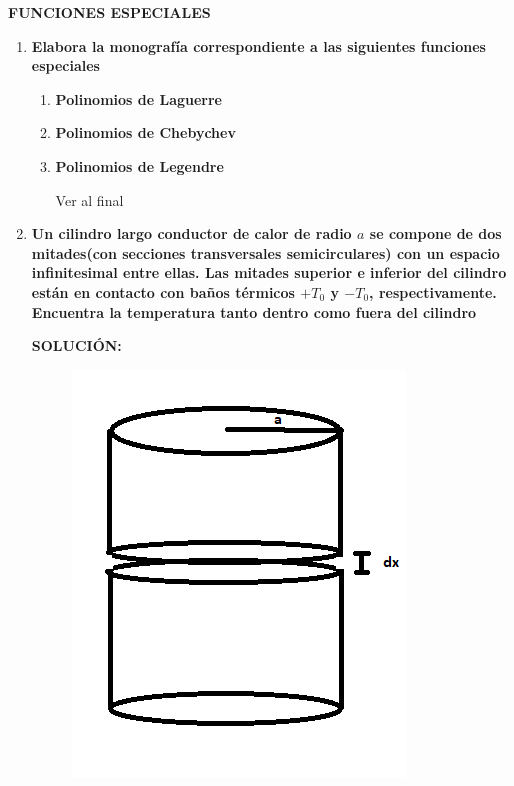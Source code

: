 \documentclass[12pt,a4paper]{article}
\begin{document}
\textbf{FUNCIONES ESPECIALES}

\begin{enumerate}






    \item \textbf{Elabora la monografía correspondiente a las siguientes funciones especiales}
    \begin{enumerate}
        \item \textbf{Polinomios de Laguerre}
        
        
        \item \textbf{Polinomios de Chebychev}
        
        \item \textbf{Polinomios de Legendre}
        
        Ver al final
        \end{enumerate}
    
    
    
    
    
    \item \textbf{Un cilindro largo conductor de calor de radio $a$ se compone de dos mitades(con secciones transversales semicirculares) con un espacio infinitesimal entre ellas. Las mitades superior e inferior del cilindro están en contacto con baños térmicos $+T_0$ y $-T_0$, respectivamente. Encuentra la temperatura tanto dentro como fuera del cilindro}
    
    \textbf{SOLUCIÓN:}
    
    \begin{figure}[h!]
        \centering
        \includegraphics[scale=0.8]{cilindro (2).png}
    \end{figure}
    

\end{enumerate}
\end{document}
